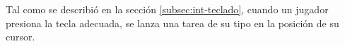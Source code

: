 Tal como se describió en la sección \ref{subsec:int-teclado}, cuando un jugador presiona la tecla adecuada, se lanza una tarea de su tipo en la posición de su cursor.






\begin{comment}
4.7.
Ejercicio 7

a) Construir una función para inicializar las estructuras de datos del scheduler.


b) Crear la función sched proximo indice() que devuelve el ındice en la GDT de la próxima
tarea a ser ejecutada. Construir la rutina de forma devuelva una tarea de cada jugador
por vez según se explica en la sección 3.2

c) Modificar la rutina de la interrupción 0x66, para que implemente los tres servicios según
se indica en la sección 3.1.1.


d) Modificar el código necesario para que se realice el intercambio de tareas por cada ciclo de
reloj. El intercambio se realizará según indique la función sched proximo indice().


e) Modificar las rutinas de excepciones del procesador para que desalojen y destruyan a la
tarea que estaba corriendo y corran la próxima.


f) Implementar el mecanismo de debugging explicado en la sección 3.4 que indicará en pan-
talla la razón del desalojo de una tarea.


Nota: Se recomienda construir funciones en C que ayuden a resolver problemas como
convertir direcciones de el mapa a direcciones fısicas o buscar la proxima tarea a ejecutar.

\end{comment}


\label{sec-desalojo}

